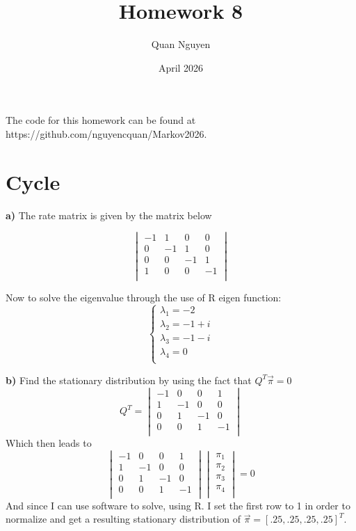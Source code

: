 \documentclass{article}
\title{Homework 8}
\author{Quan Nguyen}
\date{April 2026}
\begin{document}
\maketitle
The code for this homework can be found at https://github.com/nguyencquan/Markov2026.
\section{Cycle}

\textbf{a)} The rate matrix is given by the matrix below 

\[
\begin{vmatrix}
    -1&1&0&0\\
    0&-1&1&0\\
    0&0&-1&1\\
    1&0&0&-1\\
\end{vmatrix}
\]

Now to solve the eigenvalue through the use of R eigen function:
\[
\begin{cases}
    \lambda_1 = -2\\
    \lambda_2 = -1+i\\
    \lambda_3 = -1-i\\
    \lambda_4 = 0\\
\end{cases}
\]

\textbf{b)} Find the stationary distribution by using the fact that $Q^T\vec{\pi} = 0$
\[
Q^T = \begin{vmatrix}
    -1&0&0&1\\
    1&-1&0&0\\
    0&1&-1&0\\
    0&0&1&-1\\
\end{vmatrix}
\]
Which then leads to
\[
\begin{vmatrix}
    -1&0&0&1\\
    1&-1&0&0\\
    0&1&-1&0\\
    0&0&1&-1\\
\end{vmatrix}
\begin{vmatrix}
    \pi_1\\
    \pi_2\\
    \pi_3\\
    \pi_4\\
\end{vmatrix} = 0
\]
And since I can use software to solve, using R. I set the first row to 1 in order to normalize
and get a resulting stationary distribution of $\vec\pi = [.25,.25,.25,.25]^T$.
\end{document}
